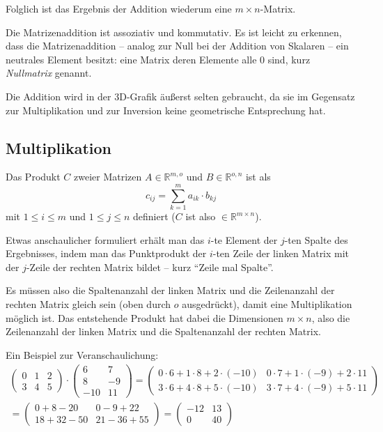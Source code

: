 Folglich ist das Ergebnis der Addition wiederum eine $m \times n$-Matrix.

Die Matrizenaddition ist assoziativ und kommutativ. Es ist leicht zu erkennen, dass die Matrizenaddition -- analog zur Null bei der Addition von Skalaren -- ein neutrales Element besitzt: eine Matrix deren Elemente alle 0 sind, kurz \emph{Nullmatrix} genannt.

Die Addition wird in der 3D-Grafik äußerst selten gebraucht, da sie im Gegensatz zur Multiplikation und zur Inversion keine geometrische Entsprechung hat.

\subsection{Multiplikation}
Das Produkt $C$ zweier Matrizen $A \in \mathbb{R}^{m,o}$ und $B \in \mathbb{R}^{o,n}$ ist als
\begin{equation}
 c_{ij} = \sum_{k=1}^m{a_{ik} \cdot b_{kj}}
\end{equation}
mit $1 \leq i \leq m$ und $1 \leq j \leq n$ definiert ($C$ ist also $\in \mathbb{R}^{m \times n}$).

Etwas anschaulicher formuliert erhält man das $i$-te Element der $j$-ten Spalte des Ergebnisses, indem man das Punktprodukt der $i$-ten Zeile der linken Matrix mit der $j$-Zeile der rechten Matrix bildet -- kurz \enquote{Zeile mal Spalte}.

Es müssen also die Spaltenanzahl der linken Matrix und die Zeilenanzahl der rechten Matrix gleich sein (oben durch $o$ ausgedrückt), damit eine Multiplikation möglich ist. Das entstehende Produkt hat dabei die Dimensionen $m \times n$, also die Zeilenanzahl der linken Matrix und die Spaltenanzahl der rechten Matrix.

Ein Beispiel zur Veranschaulichung:
\begin{equation}
\begin{split}
 \begin{pmatrix}
  0 & 1 & 2 \\
  3 & 4 & 5
 \end{pmatrix}
 \cdot
 \begin{pmatrix}
  6 & 7 \\
  8 & -9 \\
  -10 & 11
 \end{pmatrix}
 =
 \begin{pmatrix}
  0 \cdot 6 + 1 \cdot 8 + 2 \cdot (-10) & 0 \cdot 7 + 1 \cdot (-9) + 2 \cdot 11 \\
  3 \cdot 6 + 4 \cdot 8 + 5 \cdot (-10) & 3 \cdot 7 + 4 \cdot (-9) + 5 \cdot 11
 \end{pmatrix}\\
 =
 \begin{pmatrix}
  0 + 8 - 20 & 0 - 9 + 22 \\
  18 + 32 - 50 & 21 - 36 + 55
 \end{pmatrix}
 =
 \begin{pmatrix}
   -12 & 13 \\
   0 & 40
 \end{pmatrix}
\end{split}
\end{equation}

